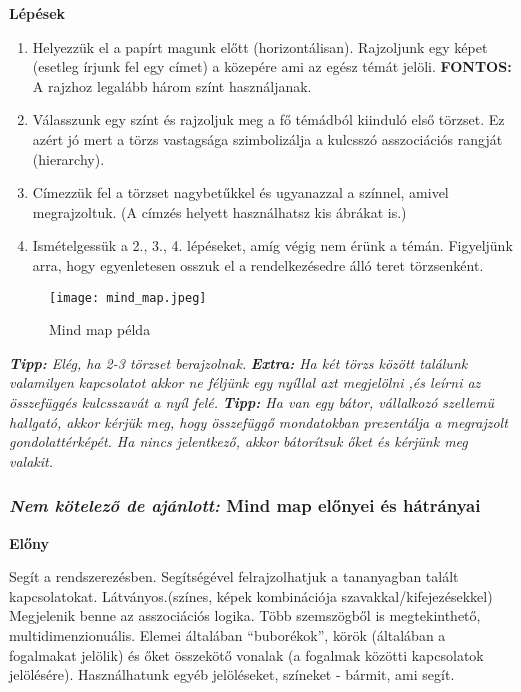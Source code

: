 \documentclass[../Main.tex]{subfiles}
\begin{document}
\textbf{Lépések}


\begin{enumerate}
    \item Helyezzük el a papírt magunk előtt (horizontálisan).
    Rajzoljunk egy képet (esetleg írjunk fel egy címet) a közepére ami az egész témát jelöli.
    \textbf{FONTOS:} A rajzhoz legalább három színt használjanak.
    
    
    \item Válasszunk egy színt és rajzoljuk meg a fő témádból kiinduló első törzset.
    Ez azért jó mert a törzs vastagsága szimbolizálja a kulcsszó asszociációs rangját (hierarchy).
    
    \item Címezzük fel a törzset nagybetűkkel és ugyanazzal a színnel, amivel megrajzoltuk.
    (A címzés helyett használhatsz kis ábrákat is.)
    
    \item Ismételgessük a 2., 3., 4. lépéseket, amíg végig nem érünk a témán. Figyeljünk arra, hogy egyenletesen osszuk el a rendelkezésedre álló teret törzsenként.
    
\end{enumerate}
\begin{wrapfigure}{r}{0.5\textwidth}
    \centering
    \texttt{[image: mind\_map.jpeg]}
    \caption{Mind map példa}
\end{wrapfigure}

\textit{\textbf{Tipp:} Elég, ha 2-3 törzset berajzolnak.} \newline
\textit{\textbf{Extra:} Ha két törzs között találunk valamilyen kapcsolatot akkor ne
féljünk egy nyíllal azt megjelölni ,és leírni az összefüggés kulcsszavát a nyíl felé.} \newline
\textit{\textbf{Tipp:} Ha van egy bátor, vállalkozó szellemü hallgató, akkor kérjük meg,
hogy összefüggő mondatokban prezentálja a megrajzolt gondolattérképét. Ha nincs jelentkező,
akkor bátorítsuk őket és kérjünk meg valakit.}

\subsubsection{\textit{Nem kötelező de ajánlott:} Mind map előnyei és hátrányai}

\textbf{Előny}

Segít a rendszerezésben.
Segítségével felrajzolhatjuk a tananyagban talált kapcsolatokat.
Látványos.(színes, képek kombinációja szavakkal/kifejezésekkel)
Megjelenik benne az asszociációs logika.
Több szemszögből is megtekinthető, multidimenzionuális.
Elemei általában “buborékok”, körök (általában a fogalmakat jelölik) és őket összekötő vonalak 
(a fogalmak közötti kapcsolatok jelölésére).
Használhatunk egyéb jelöléseket, színeket - bármit, ami segít.
\end{document}
